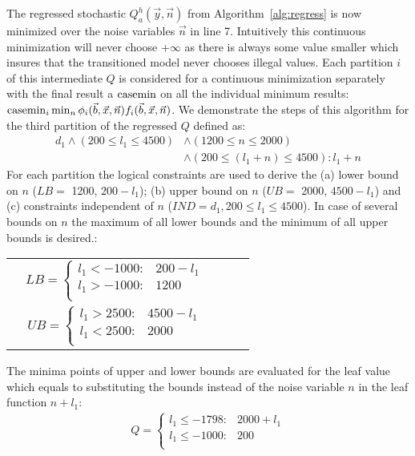 \begin{itemize}
The regressed stochastic $Q_a^{h}(\vec{y},\vec{n})$ from Algorithm~\ref{alg:regress} is now minimized over the noise variables $\vec{n}$ in line 7. Intuitively this continuous minimization will never choose +$\infty$ as there is always some value smaller which insures that the transitioned model never chooses illegal values. Each partition $i$ of this intermediate $Q$ is considered for a continuous minimization separately with the final result a $\mathrm{casemin}$ on all the individual minimum results: $\mathrm{casemin}_i \min_n \phi_i(\vec{b},\vec{x},\vec{n}) f_i(\vec{b},\vec{x},\vec{n})$.  
We demonstrate the steps of this algorithm for the third partition of the regressed $Q$ defined as:
{\footnotesize
\begin{align*}
d_1 \land (200\leq l_1\leq 4500) &\land (1200\leq n\leq 2000) \\
& \land (200\leq (l_1+n)\leq 4500): l_1 +n 
\end{align*}}
For each partition the logical constraints are used to derive the (a) lower bound on $n$ ($LB =$ 1200, $200 -l_1$); (b) upper bound on $n$ ($UB =$ 2000, $4500- l_1$)  and (c) constraints independent of $n$ ($IND= d_1, 200 \leq l_1 \leq 4500$). In case of several bounds on $n$ the maximum of all lower bounds and the minimum of all upper bounds is desired.:
{\footnotesize
\begin{center}
\begin{tabular}{r c c c l}
&
$
LB =  
\begin{cases}
 l_1 < -1000 : & 200 - l_1 \\ 
 l_1 > -1000 : & 1200 \\ 
\end{cases} 
$
\\
&
$ UB =  
\begin{cases}
l_1 >2500 : & 4500 - l_1 \\ 
l_1<2500 : & 2000 \\ 
\end{cases} 
$
\end{tabular}
\end{center}
}
The minima points of upper and lower bounds are evaluated for the leaf value which equals to substituting the bounds instead of the noise variable $n$ in the leaf function $n+ l_1$:
{\footnotesize
\begin{align}
Q =  
\begin{cases}
 l_1\leq - 1798 :&  2000 + l_1 \\
 l_1\leq - 1000 :&  200 \\

\end{cases}
\end{align}}
\end{itemize}
